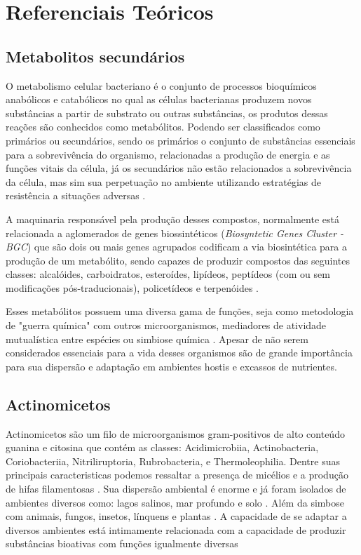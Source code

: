 \chapter{Referenciais Teóricos}\label{cap:referenciais_teoricos}

\section{Metabolitos secundários}

O metabolismo celular bacteriano é o conjunto de processos bioquímicos anabólicos e catabólicos no qual
as células bacterianas produzem novos substâncias a partir de substrato ou outras substâncias, os produtos
dessas reações são conhecidos como metabólitos. Podendo ser classificados como primários ou secundários, 
sendo os primários o conjunto de substâncias essenciais para a sobrevivência do organismo, relacionadas 
a produção de energia e as funções vitais da célula, já os secundários não estão relacionados a sobrevivência
da célula, mas sim sua perpetuação no ambiente utilizando estratégias de resistência a situações adversas \cite{gokulan2014}.  

A maquinaria responsável pela produção desses compostos, normalmente está relacionada a aglomerados 
de genes biossintéticos (\textit{Biosyntetic Genes Cluster - BGC}) que são dois ou mais genes 
agrupados codificam a via biosintética para a produção de um metabólito, sendo capazes de produzir compostos
das seguintes classes: alcalóides, carboidratos, esteroídes, lipídeos, peptídeos (com ou sem modificações pós-traducionais), policetídeos e
terpenóides \cite{medema2015}. 

Esses metabólitos possuem uma diversa gama de funções, seja como metodologia de "guerra
química" com outros microorganismos, mediadores de atividade mutualística entre espécies ou
simbiose química \cite{obrien2011}. Apesar de não serem considerados essenciais para a vida 
desses organismos \cite{demain2009} são de grande importância para sua dispersão e adaptação
em ambientes hostis e excassos de nutrientes. 

\section{Actinomicetos}

Actinomicetos são um filo de microorganismos gram-positivos de alto conteúdo
guanina e citosina que contém as classes: Acidimicrobiia, Actinobacteria, 
Coriobacteriia, Nitriliruptoria, Rubrobacteria, e Thermoleophilia\cite{yadav2018}.
Dentre suas principais caracteristicas podemos ressaltar a presença de micélios
e a produção de hifas filamentosas \cite{chater2016}. Sua dispersão ambiental é enorme
e já foram isolados de ambientes diversos como: lagos salinos, mar profundo e solo \cite{flores2021,felicio2021,sapkota2020}.
Além da simbose com animais, fungos, insetos, línquens e plantas \cite{hei2021,van2017}.
A capacidade de se adaptar a diversos ambientes está intimamente relacionada com a capacidade
de produzir substâncias bioativas com funções igualmente diversas  \cite{van2020}

